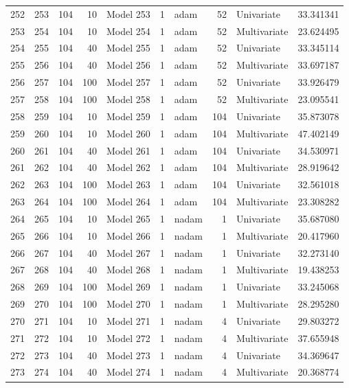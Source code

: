 \begin{tabular}{lrrrlrlrlr}
252 & 253 & 104 & 10 & Model 253 & 1 & adam & 52 & Univariate & 33.341341 \\
253 & 254 & 104 & 10 & Model 254 & 1 & adam & 52 & Multivariate & 23.624495 \\
254 & 255 & 104 & 40 & Model 255 & 1 & adam & 52 & Univariate & 33.345114 \\
255 & 256 & 104 & 40 & Model 256 & 1 & adam & 52 & Multivariate & 33.697187 \\
256 & 257 & 104 & 100 & Model 257 & 1 & adam & 52 & Univariate & 33.926479 \\
257 & 258 & 104 & 100 & Model 258 & 1 & adam & 52 & Multivariate & 23.095541 \\
258 & 259 & 104 & 10 & Model 259 & 1 & adam & 104 & Univariate & 35.873078 \\
259 & 260 & 104 & 10 & Model 260 & 1 & adam & 104 & Multivariate & 47.402149 \\
260 & 261 & 104 & 40 & Model 261 & 1 & adam & 104 & Univariate & 34.530971 \\
261 & 262 & 104 & 40 & Model 262 & 1 & adam & 104 & Multivariate & 28.919642 \\
262 & 263 & 104 & 100 & Model 263 & 1 & adam & 104 & Univariate & 32.561018 \\
263 & 264 & 104 & 100 & Model 264 & 1 & adam & 104 & Multivariate & 23.308282 \\
264 & 265 & 104 & 10 & Model 265 & 1 & nadam & 1 & Univariate & 35.687080 \\
265 & 266 & 104 & 10 & Model 266 & 1 & nadam & 1 & Multivariate & 20.417960 \\
266 & 267 & 104 & 40 & Model 267 & 1 & nadam & 1 & Univariate & 32.273140 \\
267 & 268 & 104 & 40 & Model 268 & 1 & nadam & 1 & Multivariate & 19.438253 \\
268 & 269 & 104 & 100 & Model 269 & 1 & nadam & 1 & Univariate & 33.245068 \\
269 & 270 & 104 & 100 & Model 270 & 1 & nadam & 1 & Multivariate & 28.295280 \\
270 & 271 & 104 & 10 & Model 271 & 1 & nadam & 4 & Univariate & 29.803272 \\
271 & 272 & 104 & 10 & Model 272 & 1 & nadam & 4 & Multivariate & 37.655948 \\
272 & 273 & 104 & 40 & Model 273 & 1 & nadam & 4 & Univariate & 34.369647 \\
273 & 274 & 104 & 40 & Model 274 & 1 & nadam & 4 & Multivariate & 20.368774 \\

\end{tabular}
